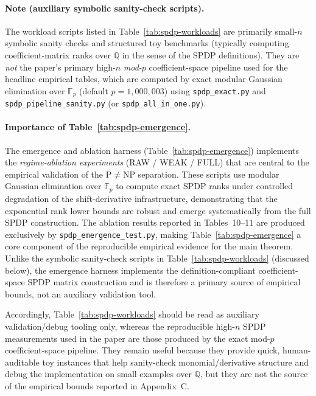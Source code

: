 \documentclass[12pt]{article}
\theoremstyle{definition}
\theoremstyle{definition}
\theoremstyle{remark}
\theoremstyle{remark}
\begin{document}
\paragraph{Note (auxiliary symbolic sanity-check scripts).}
The workload scripts listed in Table~\ref{tab:spdp-workloads} are primarily small-$n$ symbolic
sanity checks and structured toy benchmarks (typically computing coefficient-matrix ranks over
$\mathbb{Q}$ in the sense of the SPDP definitions). They are \emph{not} the paper's primary
high-$n$ \emph{mod-$p$} coefficient-space pipeline used for the headline empirical tables, which
are computed by exact modular Gaussian elimination over $\mathbb{F}_p$ (default $p=1{,}000{,}003$)
using \texttt{spdp\_exact.py} and \texttt{spdp\_pipeline\_sanity.py} (or \texttt{spdp\_all\_in\_one.py}).

\paragraph{Importance of Table~\ref{tab:spdp-emergence}.}
The emergence and ablation harness (Table~\ref{tab:spdp-emergence}) implements the \emph{regime-ablation experiments} (RAW / WEAK / FULL) that are central to the empirical validation of the P$\neq$NP separation. These scripts use modular Gaussian elimination over $\mathbb{F}_p$ to compute exact SPDP ranks under controlled degradation of the shift-derivative infrastructure, demonstrating that the exponential rank lower bounds are robust and emerge systematically from the full SPDP construction. The ablation results reported in Tables~10--11 are produced exclusively by \texttt{spdp\_emergence\_test.py}, making Table~\ref{tab:spdp-emergence} a core component of the reproducible empirical evidence for the main theorem. Unlike the symbolic sanity-check scripts in Table~\ref{tab:spdp-workloads} (discussed below), the emergence harness implements the definition-compliant coefficient-space SPDP matrix construction and is therefore a primary source of empirical bounds, not an auxiliary validation tool.

Accordingly, Table~\ref{tab:spdp-workloads} should be read as auxiliary validation/debug tooling only, whereas the reproducible high-$n$ SPDP measurements used in the paper are those produced by the exact mod-$p$ coefficient-space pipeline.
They remain useful because they provide quick, human-auditable toy instances that help sanity-check monomial/derivative structure and debug the implementation on small examples over $\mathbb{Q}$, but they are not the source of the empirical bounds reported in Appendix~C.
\end{document}
